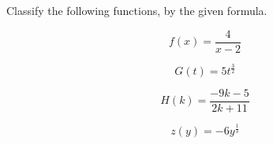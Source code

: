 \documentclass{ximera}
\author{Lee Wayand}
\begin{document}
\begin{example}




Classify the following functions, by the given formula.



\begin{question}


\[
f(x) = \frac{4}{x-2}
\]

\begin{multipleChoice}
\end{multipleChoice}


\end{question}











\begin{question}


\[
G(t) = 5 t^{\tfrac{3}{2}}
\]

\begin{multipleChoice}
\end{multipleChoice}


\end{question}







\begin{question}


\[
H(k) = \frac{-9k - 5}{2k + 11}
\]

\begin{multipleChoice}
\end{multipleChoice}


\end{question}











\begin{question}


\[
z(y) = -6 y^{\tfrac{1}{3}}
\]


\end{question}
\end{example}
\end{document}
